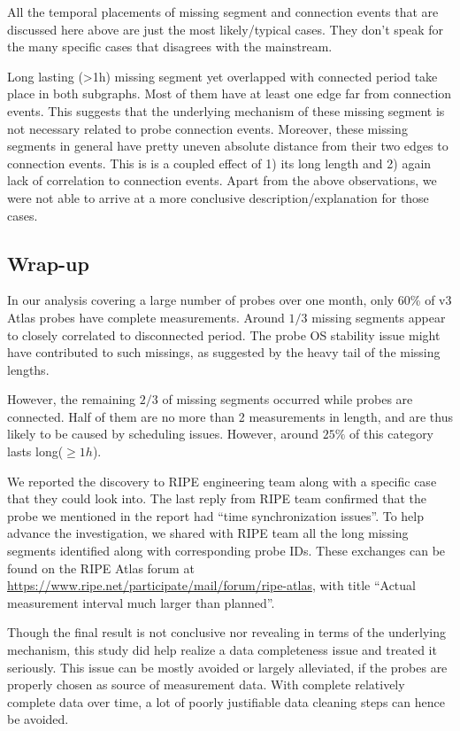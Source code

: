 All the temporal placements of missing segment and connection events that are discussed here above are just the most likely/typical cases. They don't speak for the many specific cases that disagrees with the mainstream.

Long lasting (>1h) missing segment yet overlapped with connected period take place in both subgraphs. 
Most of them have at least one edge far from connection events.
This suggests that the underlying mechanism of these missing segment is not necessary related to probe connection events.
Moreover, these missing segments in general have pretty uneven absolute distance from their two edges to connection events. 
This is is a coupled effect of 1) its long length and 2) again lack of correlation to connection events.
Apart from the above observations, we were not able to arrive at a more conclusive description/explanation for those cases.

\subsection*{Wrap-up}
In our analysis covering a large number of probes over one month, only 60\% of v3 Atlas probes have complete measurements. Around $1/3$ missing segments appear to closely correlated to disconnected period. The probe OS stability issue might have contributed to such missings, as suggested by the heavy tail of the missing lengths.

However, the remaining $2/3$ of missing segments occurred while probes are connected. 
Half of them are no more than 2 measurements in length, and are thus likely to be caused by scheduling issues. However, around $25\%$ of this category lasts long($\geq 1h$). 

We reported the discovery to RIPE engineering team along with a specific case that they could look into.
The last reply from RIPE team confirmed that the probe we mentioned in the report had ``time synchronization issues''. To help advance the investigation, we shared with RIPE team all the long missing segments identified along with corresponding probe IDs. These exchanges can be found on the RIPE Atlas forum at \url{https://www.ripe.net/participate/mail/forum/ripe-atlas}, with title ``Actual measurement interval much larger than planned''.

Though the final result is not conclusive nor revealing in terms of the underlying mechanism, this study did help realize a data completeness issue and treated it seriously.
This issue can be mostly avoided or largely alleviated, if the probes are properly chosen as source of measurement data.
With complete relatively complete data over time, a lot of poorly justifiable data cleaning steps can hence be avoided.


